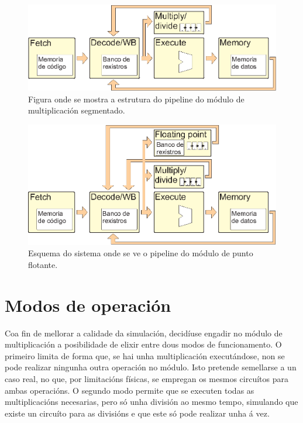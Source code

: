 \begin{figure}[hp!]
  \centering
  \includegraphics[width=\textwidth]{imaxes/pipelineMultSegm.EPS}
  \caption{Figura onde se mostra a estrutura do pipeline do módulo de multiplicación segmentado.}
  \label{fig:pipelineMultSegm}
\end{figure}

\begin{figure}[hp!]
  \centering
  \includegraphics[width=\textwidth]{imaxes/pipelinePF.EPS}
  \caption{Esquema do sistema onde se ve o pipeline do módulo de punto flotante.}
  \label{fig:pipelinePF}
\end{figure}

\section{Modos de operación}\label{sec:modos_op}
Coa fin de mellorar a calidade da simulación, decidíuse engadir no módulo de multiplicación a posibilidade de elixir entre dous modos de funcionamento. O primeiro limita de forma que, se hai unha multiplicación executándose, non se pode realizar ningunha outra operación no módulo. Isto pretende semellarse a un caso real, no que, por limitacións físicas, se empregan os mesmos circuítos para ambas operacións. O segundo modo permite que se executen todas as multiplicacións necesarias, pero só unha división ao mesmo tempo, simulando que existe un circuíto para as divisións e que este só pode realizar unha á vez.


